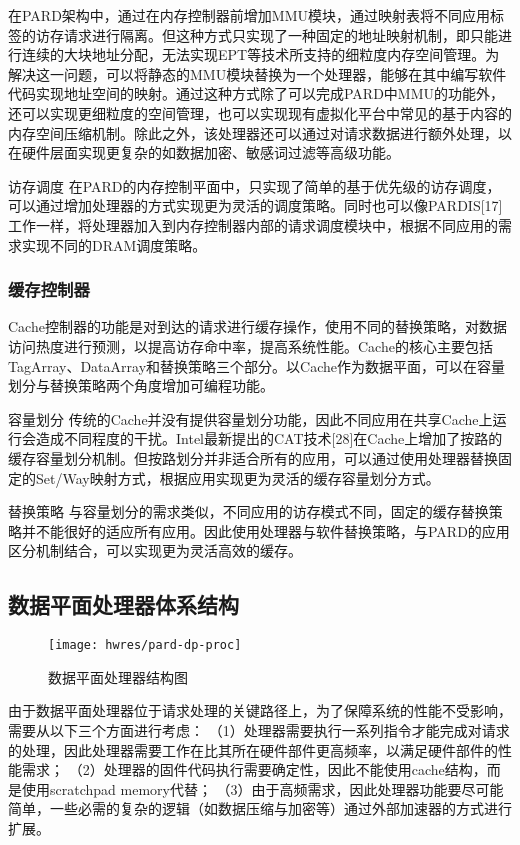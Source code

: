 在PARD架构中，通过在内存控制器前增加MMU模块，通过映射表将不同应用标签的访存请求进行隔离。但这种方式只实现了一种固定的地址映射机制，即只能进行连续的大块地址分配，无法实现EPT等技术所支持的细粒度内存空间管理。为解决这一问题，可以将静态的MMU模块替换为一个处理器，能够在其中编写软件代码实现地址空间的映射。通过这种方式除了可以完成PARD中MMU的功能外，还可以实现更细粒度的空间管理，也可以实现现有虚拟化平台中常见的基于内容的内存空间压缩机制。除此之外，该处理器还可以通过对请求数据进行额外处理，以在硬件层面实现更复杂的如数据加密、敏感词过滤等高级功能。

访存调度 在PARD的内存控制平面中，只实现了简单的基于优先级的访存调度，可以通过增加处理器的方式实现更为灵活的调度策略。同时也可以像PARDIS[17]工作一样，将处理器加入到内存控制器内部的请求调度模块中，根据不同应用的需求实现不同的DRAM调度策略。

\subsubsection*{缓存控制器}
Cache控制器的功能是对到达的请求进行缓存操作，使用不同的替换策略，对数据访问热度进行预测，以提高访存命中率，提高系统性能。Cache的核心主要包括TagArray、DataArray和替换策略三个部分。以Cache作为数据平面，可以在容量划分与替换策略两个角度增加可编程功能。

容量划分 传统的Cache并没有提供容量划分功能，因此不同应用在共享Cache上运行会造成不同程度的干扰。Intel最新提出的CAT技术[28]在Cache上增加了按路的缓存容量划分机制。但按路划分并非适合所有的应用，可以通过使用处理器替换固定的Set/Way映射方式，根据应用实现更为灵活的缓存容量划分方式。

替换策略 与容量划分的需求类似，不同应用的访存模式不同，固定的缓存替换策略并不能很好的适应所有应用。因此使用处理器与软件替换策略，与PARD的应用区分机制结合，可以实现更为灵活高效的缓存。


\subsection{数据平面处理器体系结构}

\begin{figure}[tb]
  \centering
  \texttt{[image: hwres/pard-dp-proc]}
  \caption{数据平面处理器结构图}
  \label{fig:pard-dp-proc}
\end{figure}

由于数据平面处理器位于请求处理的关键路径上，为了保障系统的性能不受影响，需要从以下三个方面进行考虑：
（1）处理器需要执行一系列指令才能完成对请求的处理，因此处理器需要工作在比其所在硬件部件更高频率，以满足硬件部件的性能需求；
（2）处理器的固件代码执行需要确定性，因此不能使用cache结构，而是使用scratchpad memory代替；
（3）由于高频需求，因此处理器功能要尽可能简单，一些必需的复杂的逻辑（如数据压缩与加密等）通过外部加速器的方式进行扩展。

